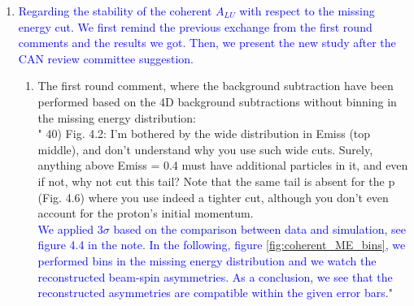 \begin{enumerate}
   \item \textcolor{blue}{Regarding the stability of the coherent $A_{LU}$ with 
      respect to the missing energy cut. We first remind the previous 
      exchange from the first round comments and the results we got. Then, we 
      present the new study after the CAN review committee suggestion.}
   
\begin{enumerate}
   \item The first round comment, where the background subtraction have been 
      performed based on the 4D background subtractions without binning in the 
      missing energy distribution: \\
      " 40) Fig.  4.2: I'm bothered by the wide distribution in Emiss (top 
      middle), and don't understand why you use such wide cuts.  Surely, 
      anything above Emiss = 0.4 must have additional particles in it, and even 
      if not, why not cut this tail?  Note that the same tail is absent for the 
      p (Fig. 4.6) where you use indeed a tighter cut, although you don't even 
      account for the proton's initial momentum.\\
   \textcolor{blue}{ We applied 3$\sigma$ based on the comparison between data 
      and simulation, see figure 4.4 in the note. In the following, figure 
      \ref{fig:coherent_ME_bins}, we performed bins in the missing energy 
      distribution and we watch the reconstructed beam-spin asymmetries. As a 
      conclusion, we see that the reconstructed asymmetries are compatible 
   within the given error bars.}" \\


\end{enumerate}
\end{enumerate}
